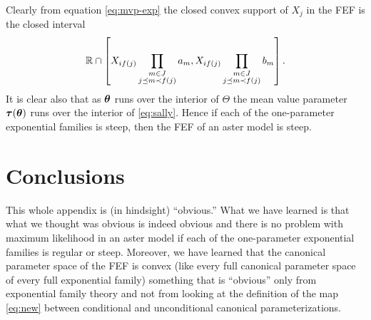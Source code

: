 Clearly from equation \eqref{eq:mvp-exp} the closed convex support of
$X_j$ in the FEF is the closed interval
\begin{equation} \label{eq:sally}
   \mathbb{R} \cap
   \left[
   X_{i f(j)}
   \prod_{\substack{m \in J \\ j \preceq m \prec f(j)}} a_m,
   X_{i f(j)}
   \prod_{\substack{m \in J \\ j \preceq m \prec f(j)}} b_m
   \right].
\end{equation}
It is clear also that as ${\boldsymbol{\theta}}$ runs over
the interior of $\Theta$ the
mean value parameter ${\boldsymbol{\tau}}({\boldsymbol{\theta}})$ runs over
the interior of \eqref{eq:sally}.  Hence if each of the
one-parameter exponential families is steep, then the FEF of an
aster model is steep.

\section{Conclusions}

This whole appendix is (in hindsight) ``obvious.''  What we have learned
is that what we thought was obvious is indeed obvious and there is no
problem with maximum likelihood in an aster model if each of the one-parameter
exponential families is regular or steep.  Moreover, we have learned that
the canonical parameter space of the FEF is convex (like every full canonical
parameter space of every full exponential family) something that is ``obvious''
only from exponential family theory and not from looking at the definition
of the map \eqref{eq:new} between conditional and unconditional canonical
parameterizations.

